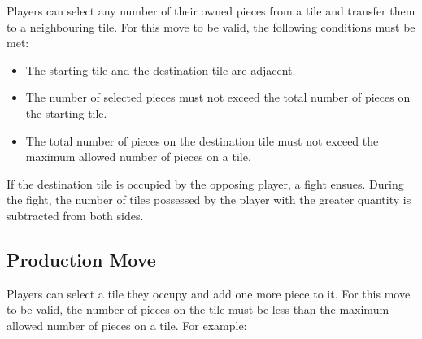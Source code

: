 \documentclass[12pt]{article}
\begin{document}
Players can select any number of their owned pieces from a tile and transfer them to a 
neighbouring tile. For this move to be valid, the following conditions must be met:
\begin{itemize}
  \item The starting tile and the destination tile are adjacent.
  \item The number of selected pieces must not exceed the total number of pieces on the
    starting tile.
  \item The total number of pieces on the destination tile must not exceed the maximum 
    allowed number of pieces on a tile.
\end{itemize}
If the destination tile is occupied by the opposing player, a fight ensues. During the
fight, the number of tiles possessed by the player with the greater quantity is 
subtracted from both sides.

\subsection*{Production Move}

Players can select a tile they occupy and add one more piece to it. For this move to be
valid, the number of pieces on the tile must be less than the maximum allowed number of 
pieces on a tile. For example:
\end{document}
